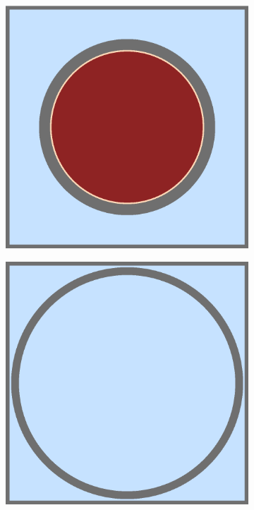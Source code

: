 \begin{figure}[H]
\centering
\begin{subfigure}{.5\textwidth}
  \centering
  \includegraphics[width=0.9\linewidth]{figures/benchmarks/fuel-pin-16}
  \caption{}
  \label{fig:chap7-pin-1.6}
\end{subfigure}%
\begin{subfigure}{.5\textwidth}
  \centering
  \includegraphics[width=0.9\linewidth]{figures/benchmarks/guide-tube}

\end{subfigure}
\end{figure}

